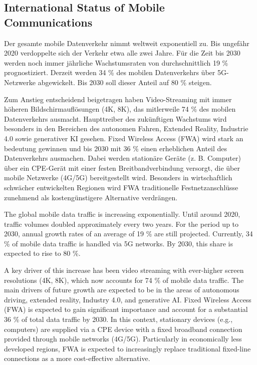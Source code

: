 \subsection{International Status of Mobile Communications}
\begin{German}
    Der gesamte mobile Datenverkehr nimmt weltweit exponentiell zu. Bis ungefähr 2020 verdoppelte sich der Verkehr etwa alle zwei Jahre. Für die Zeit bis 2030 werden noch immer jährliche Wachstumsraten von durchschnittlich 19 \% prognostiziert. Derzeit werden 34 \% des mobilen Datenverkehrs über 5G-Netzwerke abgewickelt. Bis 2030 soll dieser Anteil auf 80 \% steigen.

    Zum Anstieg entscheidend beigetragen haben Video-Streaming mit immer höheren Bildschirmauflösungen (4K, 8K), das mitlerweile 74 \% des mobilen Datenverkehrs ausmacht. Haupttreiber des zukünftigen Wachstums wird besonders in den Bereichen des autonomen Fahren, Extended Reality, Industrie 4.0 sowie generativer KI gesehen. 
    Fixed Wireless Access (FWA) wird stark an bedeutung gewinnen und bis 2030 mit 36 \% einen erheblichen Anteil des Datenverkehrs ausmachen. Dabei werden stationäre Geräte (z. B. Computer) über ein CPE-Gerät mit einer festen Breitbandverbindung versorgt, die über mobile Netzwerke (4G/5G) bereitgestellt wird. Besonders in wirtschaftlich schwächer entwickelten Regionen wird FWA traditionelle Festnetzanschlüsse zunehmend als kostengünstigere Alternative verdrängen. \cite{EricssonMobilityReport}
\end{German}

\begin{English}
    The global mobile data traffic is increasing exponentially. Until around 2020, traffic volumes doubled approximately every two years. For the period up to 2030, annual growth rates of an average of 19 \% are still projected. Currently, 34 \% of mobile data traffic is handled via 5G networks. By 2030, this share is expected to rise to 80 \%.  

    A key driver of this increase has been video streaming with ever-higher screen resolutions (4K, 8K), which now accounts for 74 \% of mobile data traffic. The main drivers of future growth are expected to be in the areas of autonomous driving, extended reality, Industry 4.0, and generative AI.  
    Fixed Wireless Access (FWA) is expected to gain significant importance and account for a substantial 36 \% of total data traffic by 2030. In this context, stationary devices (e.g., computers) are supplied via a CPE device with a fixed broadband connection provided through mobile networks (4G/5G). Particularly in economically less developed regions, FWA is expected to increasingly replace traditional fixed-line connections as a more cost-effective alternative. \cite{EricssonMobilityReport}
\end{English}

